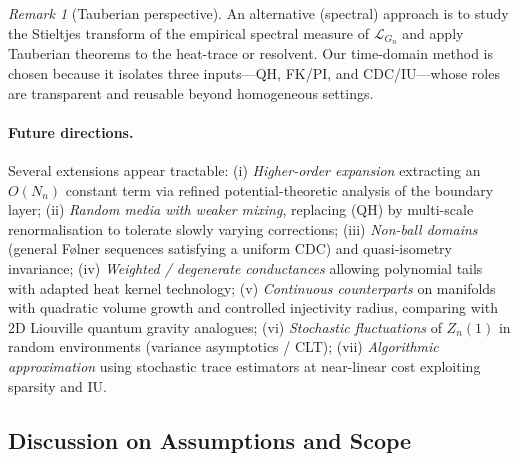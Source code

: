 \documentclass{article}
\numberwithin{equation}{section}
\theoremstyle{definition}
\theoremstyle{remark}
\newtheorem{remark}[theorem]{Remark}
\newcommand{\LL}{\mathcal{L}}
\begin{document}
\begin{remark}[Tauberian perspective]
An alternative (spectral) approach is to study the Stieltjes transform of the empirical spectral measure of $\LL_{G_n}$ and apply Tauberian theorems to the heat-trace or resolvent. Our time-domain method is chosen because it isolates three inputs---QH, FK/PI, and CDC/IU---whose roles are transparent and reusable beyond homogeneous settings.
\end{remark}

\paragraph{Future directions.} Several extensions appear tractable: (i) \emph{Higher-order expansion} extracting an $O(N_n)$ constant term via refined potential-theoretic analysis of the boundary layer; (ii) \emph{Random media with weaker mixing}, replacing (QH) by multi-scale renormalisation to tolerate slowly varying corrections; (iii) \emph{Non-ball domains} (general Følner sequences satisfying a uniform CDC) and quasi-isometry invariance; (iv) \emph{Weighted / degenerate conductances} allowing polynomial tails with adapted heat kernel technology; (v) \emph{Continuous counterparts} on manifolds with quadratic volume growth and controlled injectivity radius, comparing with 2D Liouville quantum gravity analogues; (vi) \emph{Stochastic fluctuations} of $Z_n(1)$ in random environments (variance asymptotics / CLT); (vii) \emph{Algorithmic approximation} using stochastic trace estimators at near-linear cost exploiting sparsity and IU.

\subsection{Discussion on Assumptions and Scope}
\end{document}
